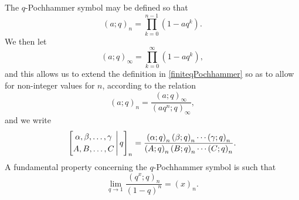 \documentclass[12pt]{article}
\begin{document}
 The {$q$-Pochhammer symbol} may be defined so that 
\begin{equation}\label{finiteqPochhammer}
 (a;q)_{n} = \prod_{k=0}^{n-1} (1- aq^{k}). 
\end{equation}
 We then let 
 $$ (a;q)_{\infty} = \prod_{k=0}^{\infty} \left( 1 - a q^{k} \right),$$
 and this allows us to extend the definition in \eqref{finiteqPochhammer}
 so as to allow for non-integer values for $n$, according to the relation 
 $$ (a;q)_{n} = \frac{ \left( a;q \right)_{\infty} }{ \left( a q^{n}; q \right)_{\infty}}, $$ 
 and we write 
 \begin{equation}\label{ChuqPochhammer}
 \left[ \begin{matrix} \alpha, \beta, \ldots, \gamma \vspace{1mm} \\ 
 A, B, \ldots, C \end{matrix} \, \Bigg| \, q \right]_{n} 
 = \frac{ \left( \alpha; q \right)_{n} 
 \left( \beta; q \right)_{n} \cdots \left( \gamma; q \right)_{n} }{ 
 \left( A; q \right)_{n} 
 \left( B; q \right)_{n} \cdots \left( C; q \right)_{n}}. 
\end{equation}
 A fundamental property concerning the $q$-Pochhammer symbol is such that 
\begin{equation}\label{limitqPochhammer}
 \lim_{q \to 1} \frac{ \left( q^{x}; q \right)_{n} }{ (1-q)^{n} } = (x)_{n}. 
\end{equation}
\end{document}
